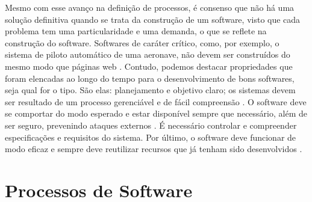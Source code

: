 Mesmo com esse avanço na definição de processos, é consenso que não há uma solução definitiva quando se trata da construção de um software, visto que cada problema tem uma particularidade e uma demanda, o que se reflete na construção do software. Softwares de caráter crítico, como, por exemplo, o sistema de piloto automático de uma aeronave, não devem ser construídos do mesmo modo que páginas web \cite{sommerville2016}. Contudo, podemos destacar propriedades que foram elencadas ao longo do tempo para o desenvolvimento de bons softwares, seja qual for o tipo. São elas: planejamento e objetivo claro; os sistemas devem ser resultado de um processo gerenciável e de fácil compreensão \cite{sommerville2016}. O software deve se comportar do modo esperado e estar disponível sempre que necessário, além de ser seguro, prevenindo ataques externos \cite{iso25010_2023}. É necessário controlar e compreender especificações e requisitos do sistema. Por último, o software deve funcionar de modo eficaz e sempre deve reutilizar recursos que já tenham sido desenvolvidos \cite{swebok2024}.

\section{Processos de Software}

